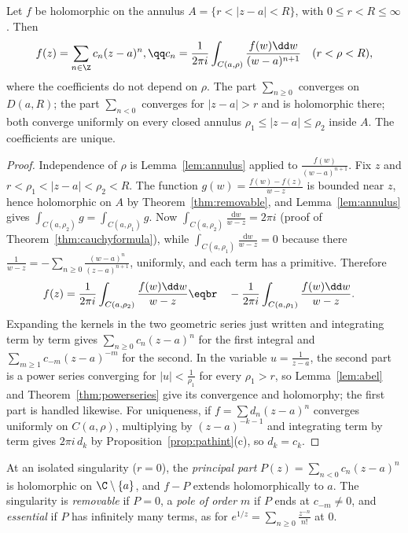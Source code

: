 \begin{theorem}[Laurent]\label{thm:laurent}
Let $f$ be holomorphic on the annulus $A=\{r<|z-a|<R\}$, with $0\le r<R\le\infty$. Then
\[
\begin{gathered}f(z)=\sum_{n\in\Z}c_n(z-a)^n,\qq c_n=\frac1{2\pi i}\int_{C(a,\rho)}\frac{f(w)\dd w}{(w-a)^{n+1}}\quad(r<\rho<R),\end{gathered}
\]
where the coefficients do not depend on $\rho$. The part $\sum_{n\ge0}$ converges on $D(a,R)$; the part $\sum_{n<0}$ converges for $|z-a|>r$ and is
holomorphic there; both converge uniformly on every closed annulus $\rho_1\le|z-a|\le\rho_2$ inside $A$. The coefficients are unique.
\end{theorem}
\begin{proof}
Independence of $\rho$ is Lemma~\ref{lem:annulus} applied to $\frac{f(w)}{(w-a)^{n+1}}$. Fix $z$ and $r<\rho_1<|z-a|<\rho_2<R$. The function
$g(w)=\frac{f(w)-f(z)}{w-z}$ is bounded near $z$, hence holomorphic on $A$ by Theorem~\ref{thm:removable}, and Lemma~\ref{lem:annulus} gives
$\int_{C(a,\rho_2)}g=\int_{C(a,\rho_1)}g$. Now $\int_{C(a,\rho_2)}\frac{\mathrm dw}{w-z}=2\pi i$ (proof of Theorem~\ref{thm:cauchyformula}), while $\int_{C(a,\rho_1)}\frac{\mathrm dw}{w-z}=0$
because there $\frac1{w-z}=-\sum_{n\ge0}\frac{(w-a)^n}{(z-a)^{n+1}}$, uniformly, and each term has a primitive. Therefore
\[
\begin{aligned}f(z)&=\frac1{2\pi i}\int_{C(a,\rho_2)}\frac{f(w)\dd w}{w-z}\eqbr\quad-\frac1{2\pi i}\int_{C(a,\rho_1)}\frac{f(w)\dd w}{w-z}.\end{aligned}
\]
Expanding the kernels in the two geometric series just written and integrating term by term gives $\sum_{n\ge0}c_n(z-a)^n$ for the first
integral and $\sum_{m\ge1}c_{-m}(z-a)^{-m}$ for the second. In the variable $u=\frac1{z-a}$, the second part is a power series converging for $|u|<\frac1{\rho_1}$ for
every $\rho_1>r$, so Lemma~\ref{lem:abel} and Theorem~\ref{thm:powerseries} give its convergence and holomorphy; the first part is handled likewise.
For uniqueness, if $f=\sum d_n(z-a)^n$ converges uniformly on $C(a,\rho)$, multiplying by $(z-a)^{-k-1}$ and integrating term by term
gives $2\pi i\,d_k$ by Proposition~\ref{prop:pathint}(c), so $d_k=c_k$.
\end{proof}

At an isolated singularity ($r=0$), the \emph{principal part} $P(z)=\sum_{n<0}c_n(z-a)^n$ is holomorphic on $\C\setminus\{a\}$, and $f-P$ extends
holomorphically to $a$. The singularity is \emph{removable} if $P=0$, a \emph{pole of order $m$} if $P$ ends at $c_{-m}\ne0$, and \emph{essential}
if $P$ has infinitely many terms, as for $e^{1/z}=\sum_{n\ge0}\frac{z^{-n}}{n!}$ at $0$.

